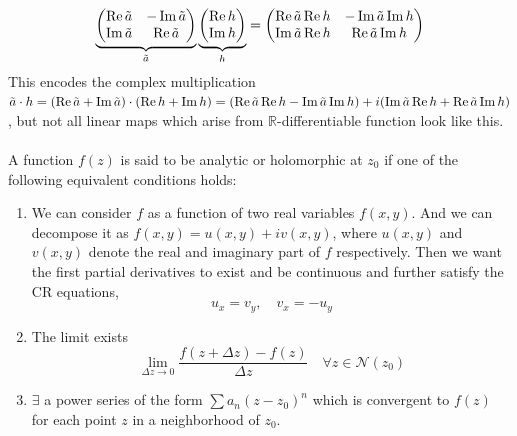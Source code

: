 $$
\underbrace{\begin{pmatrix}
    \Re \Tilde a & -\Im \Tilde a\\ \Im \Tilde a & \Re \Tilde a
\end{pmatrix}}_{\Tilde{a}}
\underbrace{\begin{pmatrix}
    \Re h\\ \Im h
\end{pmatrix}}_{h}=
\begin{pmatrix}
    \Re \Tilde a \Re h & -\Im \Tilde a\Im h\\ \Im \Tilde a \Re h & \Re \Tilde a\Im h
\end{pmatrix}
$$
This encodes the complex multiplication $\Tilde a\cdot h=(\Re \Tilde a +\Im \Tilde a)\cdot (\Re h +\Im h)=(\Re \Tilde a \Re h -\Im \Tilde a\Im h)+i(\Im \Tilde a \Re h + \Re \Tilde a\Im h)$, but not all linear maps which arise from $\mathbb R$-differentiable function look like this.\\~\\
A function $f(z)$ is said to be analytic or holomorphic at $z_0$ if one of the following equivalent conditions holds:
\begin{enumerate}[label=\textbf{C\arabic*}]
    \item \label{hol_C_1} We can consider $f$ as a function of two real variables $f(x,y)$. And we can decompose it as $f(x,y)=u(x,y)+iv(x,y)$, where $u(x,y)$ and $v(x,y)$ denote the real and imaginary part of $f$ respectively. Then we want the first partial derivatives to exist and be continuous and further satisfy the CR equations, $$u_x=v_y,\quad v_x=-u_y$$
    \item \label{hol_C_2} The limit exists $$\lim_{\Delta  z\rightarrow0}\frac{f(z+\Delta z)-f(z)}{\Delta z}\quad\forall z\in \mathcal N(z_0)$$
    \item \label{hol_C_3} $\exists$ a power series of the form $\sum a_n (z-z_0)^n$ which is convergent to $f(z)$ for each point $z$ in a neighborhood of $z_0$.
\end{enumerate}


